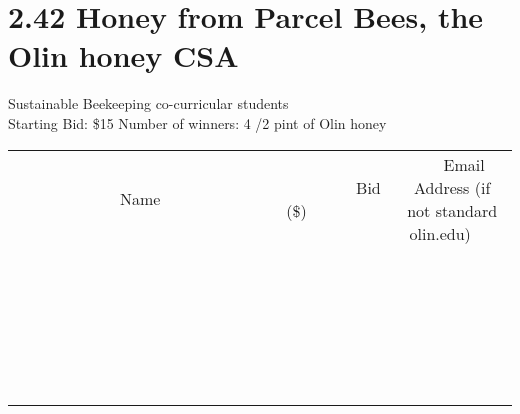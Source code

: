 \documentclass[11pt]{article}
\begin{document}
\section*{2.42 Honey from Parcel Bees, the Olin honey CSA}
Sustainable Beekeeping co-curricular students
\\
Starting Bid: \$15
\newline
Number of winners: 4
/2 pint of Olin honey
\\[6ex]
\begin{tabular}{c c c}
~~~~~~~~~~~~~Name~~~~~~~~~~~~~ & ~~~~~~~~~Bid (\$)~~~~~~~~~  & ~~~Email Address (if not standard olin.edu)~~~\\
 & & \\
\hline
 & & \\
\hline
 & & \\
\hline
 & & \\
\hline
 & & \\
\hline
 & & \\
\hline
 & & \\
\hline
 & & \\
\hline
 & & \\
\hline
 & & \\
\hline
 & & \\
\hline
 & & \\
\hline
 & & \\
\hline
 & & \\
\hline
 & & \\
\hline
 & & \\
\hline
 & & \\
\hline
 & & \\
\hline
 & & \\
\hline
 & & \\
\hline
 & & \\
\hline
 & & \\
\hline
 & & \\
\hline
 & & \\
\hline
 & & \\
\hline
 & & \\
\hline
\end{tabular}
\newpage
\end{document}
